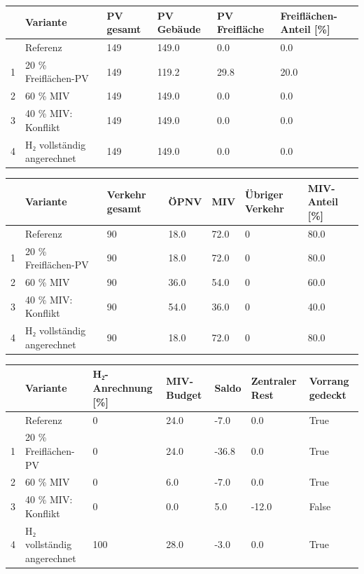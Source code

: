\documentclass[
  ngerman,
  a4paper,
  DIV=11]{scrreprt}
\newcounter{none} %
\begin{document}
{\def\LTcaptype{none} %
\begin{longtable}[]{@{}llllll@{}}
\toprule\noalign{}
& Variante & PV gesamt & PV Gebäude & PV Freifläche & Freiflächen-Anteil
{[}\%{]} \\
\midrule\noalign{}
\endhead
\bottomrule\noalign{}
\endlastfoot
0 & Referenz & 149 & 149.0 & 0.0 & 0.0 \\
1 & 20 \% Freiflächen-PV & 149 & 119.2 & 29.8 & 20.0 \\
2 & 60 \% MIV & 149 & 149.0 & 0.0 & 0.0 \\
3 & 40 \% MIV: Konflikt & 149 & 149.0 & 0.0 & 0.0 \\
4 & H₂ vollständig angerechnet & 149 & 149.0 & 0.0 & 0.0 \\
\end{longtable}
}

{\def\LTcaptype{none} %
\begin{longtable}[]{@{}lllllll@{}}
\toprule\noalign{}
& Variante & Verkehr gesamt & ÖPNV & MIV & Übriger Verkehr & MIV-Anteil
{[}\%{]} \\
\midrule\noalign{}
\endhead
\bottomrule\noalign{}
\endlastfoot
0 & Referenz & 90 & 18.0 & 72.0 & 0 & 80.0 \\
1 & 20 \% Freiflächen-PV & 90 & 18.0 & 72.0 & 0 & 80.0 \\
2 & 60 \% MIV & 90 & 36.0 & 54.0 & 0 & 60.0 \\
3 & 40 \% MIV: Konflikt & 90 & 54.0 & 36.0 & 0 & 40.0 \\
4 & H₂ vollständig angerechnet & 90 & 18.0 & 72.0 & 0 & 80.0 \\
\end{longtable}
}

{\def\LTcaptype{none} %
\begin{longtable}[]{@{}lllllll@{}}
\toprule\noalign{}
& Variante & H₂-Anrechnung {[}\%{]} & MIV-Budget & Saldo & Zentraler
Rest & Vorrang gedeckt \\
\midrule\noalign{}
\endhead
\bottomrule\noalign{}
\endlastfoot
0 & Referenz & 0 & 24.0 & -7.0 & 0.0 & True \\
1 & 20 \% Freiflächen-PV & 0 & 24.0 & -36.8 & 0.0 & True \\
2 & 60 \% MIV & 0 & 6.0 & -7.0 & 0.0 & True \\
3 & 40 \% MIV: Konflikt & 0 & 0.0 & 5.0 & -12.0 & False \\
4 & H₂ vollständig angerechnet & 100 & 28.0 & -3.0 & 0.0 & True \\
\end{longtable}
}
\end{document}
